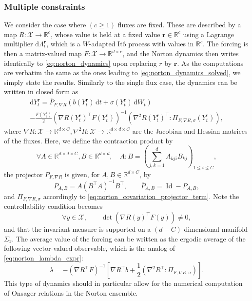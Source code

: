 \documentclass[pdflatex,sn-mathphys]{sn-jnl}%
\theoremstyle{thmstyleone}%
\theoremstyle{thmstyletwo}%
\theoremstyle{thmstylethree}%
\renewcommand{\d}{\mathrm{d}}
\newcommand{\1}{\mathbbm{1}}
\newcommand{\Ybr}{Y^{\mathbf{r}}}
\begin{document}
    \subsubsection{Multiple constraints}
    We consider the case where $(c\geq 1)$ fluxes are fixed. These are described by a map $R:\mathcal X \to \mathbb{R}^c$, whose value is held at a fixed value $\mathbf{r}\in\mathbb{R}^c$ using a Lagrange multiplier $\d\Lambda_t^{\mathbf{r}}$, which is a $W$-adapted Itô process with values in $\mathbb{R}^c$. The forcing is then a matrix-valued map $F:\mathcal X \to \mathbb{R}^{d\times c}$, and the Norton dynamics then writes identically to \eqref{eq:norton_dynamics} upon replacing $r$ by $\mathbf{r}$.
    As the computations are verbatim the same as the ones leading to \eqref{eq:norton_dynamics_solved}, we simply state the results.
    Similarly to the single flux case, the dynamics can be written in closed form as
    \begin{multline}
        \d \Ybr_t =\overline{P}_{F,\nabla R}(b(\Ybr_t)\,\d t +\sigma(\Ybr_t)\,\d W_t)\\
        - \frac{F(\Ybr_t)}2(\nabla R(\Ybr_t)^\intercal F(\Ybr_t))^{-1}\left(\nabla^2 R(\Ybr_t)^\intercal: \Pi_{F,\nabla R,\sigma}(\Ybr_t)\right),
    \end{multline}
    where $\nabla R : \mathcal X\to \mathbb{R}^{d\times C}, \nabla^2 R: \mathcal X \to \mathbb{R}^{d\times d\times C}$ are the Jacobian and Hessian matrices of the fluxes. Here, we define the contraction product by
    \[\forall A\in \mathbb{R}^{d\times d\times C}, B\in \mathbb{R}^{d\times d},\quad A:B = \left(\sum_{j,k=1}^d A_{kji}B_{kj}\right)_{1\leq i\leq C},\]
    the projector $\overline{P}_{F,\nabla R}$ is given, for $A,B\in \mathbb{R}^{d\times C}$, by
    \[P_{A,B} = A(B^\intercal A)^{-1}B^\intercal,\qquad \overline{P}_{A,B} = \operatorname{Id}-P_{A,B},\]
    and $\Pi_{F,\nabla R,\sigma}$ accordingly to \eqref{eq:norton_covariation_projector_term}. Note the controllability condition becomes
    \begin{equation}
        \forall y\in \mathcal X,\qquad\operatorname{det}(\nabla R(y)^\intercal F(y)) \neq 0, 
    \end{equation}
    and that the invariant measure is supported on a $(d-C)$-dimensional manifold $\Sigma_{\mathbf{r}}$.
    The average value of the forcing can be written as the ergodic average of the following vector-valued observable, which is the analog of \eqref{eq:norton_lambda_expr}:
    \begin{equation}
        \lambda = -(\nabla R^\intercal F)^{-1}\left[\nabla R^\intercal b + \frac12\left(\nabla^2 R^\intercal: \Pi_{F,\nabla R,\sigma}\right)\right].
    \end{equation}
    This type of dynamics should in particular allow for the numerical computation of Onsager relations in the Norton ensemble.
    
\end{document}
